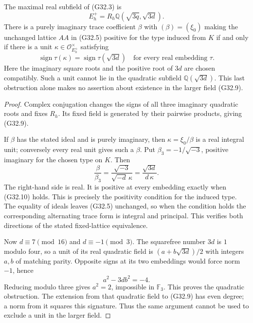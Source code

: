 \begin{proposition}
\label{AC-G32-signature}
The maximal real subfield of (G32.3) is
\[
 E_h^+=R_h\mathbb Q(\sqrt{3q},\sqrt{3d}).             \tag{G32.9}
\]
There is a purely imaginary trace coefficient $\beta$
with $(\beta)=(\xi_0)$ making the unchanged lattice
$AA$ in (G32.5) positive for the type induced from $K$
if and only if there is a unit
$\kappa\in\mathcal O_{E_h^+}^{\times}$ satisfying
\[
 \operatorname{sign}\tau(\kappa)
       =\operatorname{sign}\tau(\sqrt{3d})
             \quad\text{for every real embedding }\tau.
                                                               \tag{G32.10}
\]
Here the imaginary square roots and the positive root of
$3d$ are chosen compatibly.  Such a unit cannot lie in
the quadratic subfield $\mathbb Q(\sqrt{3d})$.
This last obstruction alone makes no assertion about
existence in the larger field (G32.9).
\end{proposition}
\begin{proof}
Complex conjugation changes the signs of all three
imaginary quadratic roots and fixes $R_h$.  Its fixed
field is generated by their pairwise products, giving
(G32.9).

If $\beta$ has the stated ideal and is purely imaginary,
then $\kappa=\xi_0/\beta$ is a real integral unit;
conversely every real unit gives such a $\beta$.
Put $\beta_3=-1/\sqrt{-3}$, positive imaginary for the
chosen type on $K$.  Then
\[
 \frac{\beta}{\beta_3}
       =\frac{\sqrt{-3}}{\sqrt{-d}\,\kappa}
       =\frac{\sqrt{3d}}{d\,\kappa}.                 \tag{G32.11}
\]
The right-hand side is real.  It is positive at every
embedding exactly when (G32.10) holds.  This is precisely
the positivity condition for the induced type.
The equality of ideals leaves (G32.5) unchanged, so
when the condition holds the corresponding alternating
trace form is integral and principal.  This verifies
both directions of the stated fixed-lattice equivalence.

Now $d\equiv7\pmod {16}$ and $d\equiv-1\pmod3$.
The squarefree number $3d$ is $1$ modulo four, so a
unit of its real quadratic field is
$(a+b\sqrt{3d})/2$ with integers $a,b$ of matching parity.
Opposite signs at its two embeddings would force norm
$-1$, hence
\[
                         a^2-3db^2=-4.
\]
Reducing modulo three gives $a^2=2$, impossible in
$\mathbb F_3$.  This proves the quadratic obstruction.
The extension from that quadratic field to (G32.9) has
even degree; a norm from it squares this signature.
Thus the same argument cannot be used to exclude a
unit in the larger field.
\end{proof}

